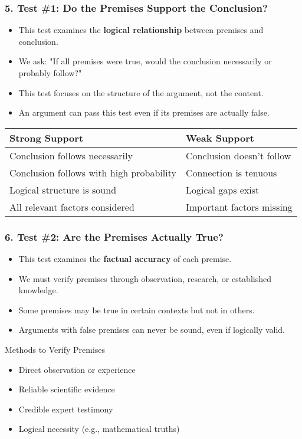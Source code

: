 \documentclass{beamer}
\begin{document}
\begin{frame}
\frametitle{5. Test \#1: Do the Premises Support the Conclusion?}
\begin{itemize}
\item This test examines the \textbf{logical relationship} between premises and conclusion.
\item We ask: "If all premises were true, would the conclusion necessarily or probably follow?"
\item This test focuses on the structure of the argument, not the content.
\item An argument can pass this test even if its premises are actually false.
\end{itemize}

\begin{table}
\scriptsize
\begin{tabular}{|l|l|}
\hline
\textbf{Strong Support} & \textbf{Weak Support} \\
\hline
Conclusion follows necessarily & Conclusion doesn't follow \\
Conclusion follows with high probability & Connection is tenuous \\
Logical structure is sound & Logical gaps exist \\
All relevant factors considered & Important factors missing \\
\hline
\end{tabular}
\end{table}
\end{frame}

\begin{frame}
\frametitle{6. Test \#2: Are the Premises Actually True?}
\begin{itemize}
\item This test examines the \textbf{factual accuracy} of each premise.
\item We must verify premises through observation, research, or established knowledge.
\item Some premises may be true in certain contexts but not in others.
\item Arguments with false premises can never be sound, even if logically valid.
\end{itemize}

\begin{block}{Methods to Verify Premises}
\begin{itemize}
\item Direct observation or experience
\item Reliable scientific evidence
\item Credible expert testimony
\item Logical necessity (e.g., mathematical truths)
\end{itemize}
\end{block}
\end{frame}
\end{document}
